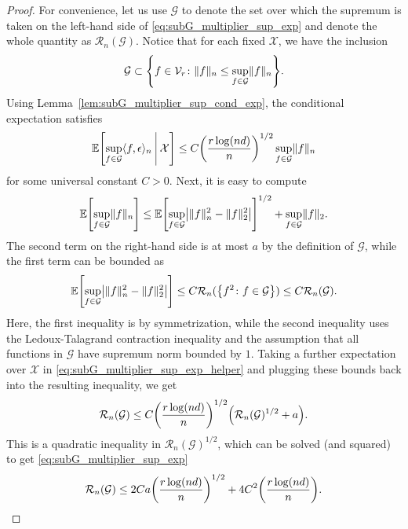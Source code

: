 \documentclass[11pt]{article}
\theoremstyle{plain}
\theoremstyle{definition}
\theoremstyle{remark}
\theoremstyle{plain}
\DeclarePairedDelimiter{\braces}{\lbrace}{\rbrace}
\DeclarePairedDelimiter{\bracks}{[}{]}
\DeclarePairedDelimiter{\paren}{(}{)}
\DeclarePairedDelimiter{\abs}{|}{|}
\DeclarePairedDelimiter{\norm}{\|}{\|}
\DeclarePairedDelimiter{\inprod}{\langle}{\rangle}
\newcommand{\E}{\mathbb{E}}
\newcommand{\partfunc}{\mathcal{V}}
\newcommand{\1}{\mathbbm{1}}
\newcommand{\sample}{\mathcal{X}}
\newcommand{\Rad}[1]{\mathcal{R}_n(#1)}
\begin{document}
\begin{proof}   
    For convenience, let us use $\mathcal{G}$ to denote the set over which the supremum is taken on the left-hand side of \eqref{eq:subG_multiplier_sup_exp} and denote the whole quantity as $\Rad{\mathcal{G}}$.
    Notice that for each fixed $\sample$, 
    we have the inclusion
    \begin{equation}
        \mathcal{G} \subset \braces*{f \in \partfunc_r \colon \norm{f}_n \leq \sup_{f \in \mathcal{G}} \norm{f}_n}.
    \end{equation}
    Using Lemma~\ref{lem:subG_multiplier_sup_cond_exp}, the conditional expectation satisfies
    \begin{equation}
    \label{eq:subG_multiplier_sup_exp_helper}
        \E\bracks*{\sup_{f \in \mathcal{G}} \inprod{f,\epsilon}_n~\vline~ \sample} \leq C\paren*{\frac{r\log(nd)}{n}}^{1/2} \sup_{f \in \mathcal{G}} \norm{f}_n
    \end{equation}
    for some universal constant $C > 0$.
    Next, it is easy to compute
    \begin{equation}
        \E\bracks*{\sup_{f \in \mathcal{G}} \norm{f}_n} \leq \E\bracks*{\sup_{f \in \mathcal{G}} \abs*{\norm{f}_n^2 - \norm{f}_2^2}}^{1/2} + \sup_{f \in \mathcal{G}} \norm{f}_2.
    \end{equation}
    The second term on the right-hand side is at most $a$ by the definition of $\mathcal{G}$, while the first term can be bounded as
    \begin{equation}
    \label{eq:subG_multiplier_sup_exp_helper2}
        \E\bracks*{\sup_{f \in \mathcal{G}} \abs*{\norm{f}_n^2 - \norm{f}_2^2}} \leq C\Rad{\braces*{f^2 \colon f \in \mathcal{G}}} \leq C\Rad{\mathcal{G}}.
    \end{equation}
    Here, the first inequality is by symmetrization, while the second inequality uses the Ledoux-Talagrand contraction inequality and the assumption that all functions in $\mathcal{G}$ have supremum norm bounded by $1$.
    Taking a further expectation over $\sample$ in \eqref{eq:subG_multiplier_sup_exp_helper} and plugging these bounds back into the resulting inequality, we get
    \begin{equation}
        \Rad{\mathcal{G}} \leq C\paren*{\frac{r\log(nd)}{n}}^{1/2}\paren*{\Rad{\mathcal{G}}^{1/2} + a}.
    \end{equation}
    This is a quadratic inequality in $\Rad{\mathcal{G}}^{1/2}$, which can be solved (and squared) to get \eqref{eq:subG_multiplier_sup_exp}
    \begin{equation}
    \label{eq:subG_multiplier_sup_exp_helper3}
        \Rad{\mathcal{G}} \leq 2Ca\paren*{\frac{r\log(nd)}{n}}^{1/2} + 4C^2\paren*{\frac{r\log(nd)}{n}}.
    \end{equation}   
\end{proof}
\end{document}
